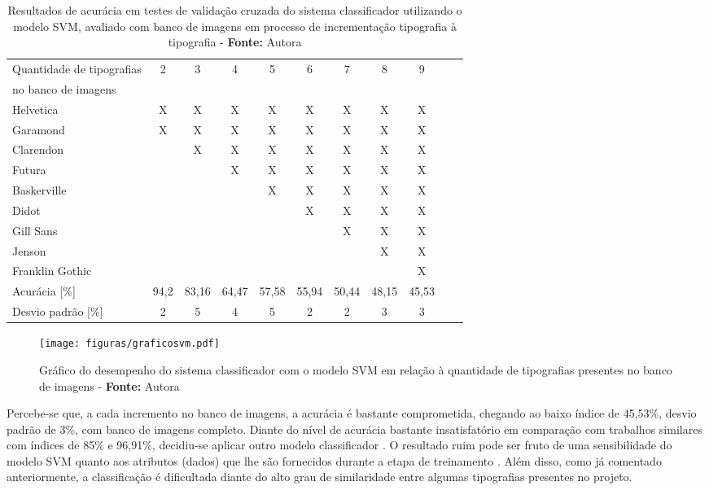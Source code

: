 
\begin{table}[h]
 \centering
 \begin{tabular}{l|c|c|c|c|c|c|c|c|c|c}
    Quantidade de tipografias  & 2 & 3 & 4 & 5 & 6 & 7 & 8 & 9\\ no banco de imagens & & & & & & & & \\
	\hline
	Helvetica & X & X & X & X & X & X & X & X   \\
	Garamond & X & X & X & X & X & X & X & X  \\
	Clarendon &  & X & X & X & X & X & X & X    \\
	Futura &  &  & X & X & X & X & X & X  \\
	Baskerville &  &  &  & X & X & X & X & X    \\
	Didot &  &  &  &  & X & X & X & X    \\
	Gill Sans &  &  &  &  &  & X & X & X   \\
	Jenson &  &  &  &  &  &  & X & X  \\
	Franklin Gothic &  &  &  &  &  &  &  & X  \\
	\hline
	Acurácia [\%] & 94,2 & 83,16 & 64,47 & 57,58 & 55,94 & 50,44 & 48,15 & 45,53 \\
	Desvio padrão [\%] & 2 & 5 & 4 & 5 & 2 & 2 & 3 & 3\\
 \end{tabular}
 \caption{Resultados de acurácia em testes de validação cruzada do sistema classificador utilizando o modelo SVM, avaliado com banco de imagens em processo de incrementação tipografia à tipografia - \textbf{Fonte:} Autora}
 \label{tab:svmResults}
\end{table}


\begin{figure}[H]
 \centering
  \texttt{[image: figuras/graficosvm.pdf]}
  \caption{Gráfico do desempenho do sistema classificador com o modelo SVM em relação à quantidade de tipografias presentes no banco de imagens - \textbf{Fonte:} Autora}
  \label{fig:graficoSVM}
\end{figure}

Percebe-se que, a cada incremento no banco de imagens, a acurácia é bastante comprometida, chegando ao baixo índice de 45,53\%, desvio padrão de 3\%, com banco de imagens completo. Diante do nível de acurácia bastante insatisfatório em comparação com trabalhos similares com índices de 85\% e 96,91\%, decidiu-se aplicar outro modelo classificador  . O resultado ruim pode ser fruto de uma sensibilidade do modelo SVM quanto aos atributos (dados) que lhe são fornecidos durante a etapa de treinamento . Além disso, como já comentado anteriormente, a classificação é dificultada diante do alto grau de similaridade entre algumas tipografias presentes no projeto.

